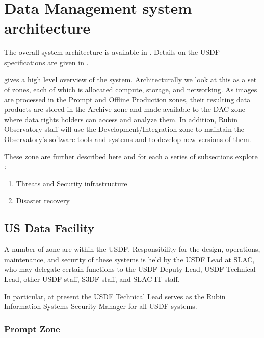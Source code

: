 

\section{Data Management system architecture} \label{sec:dparc}
The overall system architecture is available in .
Details on the \gls{USDF} specifications are given in .

 gives a high level overview of the system. Architecturally we look
at this as a set of zones, each of which is allocated compute, storage, and networking.
As images are processed in the Prompt and Offline Production zones, their resulting data products are stored in the \gls{Archive} zone and made available to the \gls{DAC} zone where data rights holders can access and analyze them.
In addition, Rubin Observatory staff will use the Development/Integration zone to maintain the Observatory's \gls{software} tools and systems and to develop new versions of them.

These zone are further described here and for each a series of subsections explore :


\begin{enumerate}
\item Threats and Security infrastructure
\item Disaster recovery
\end{enumerate}

\subsection{US Data Facility}\label{sec:usdf}

A number of zone are within the \gls{USDF}.
Responsibility for the design, operations, maintenance, and security of these systems is held by the \gls{USDF} Lead at SLAC, who may delegate certain functions to the \gls{USDF} Deputy Lead, \gls{USDF} Technical Lead, other \gls{USDF} staff, S3DF staff, and SLAC IT staff.

In particular, at present the USDF Technical Lead serves as the Rubin Information Systems Security Manager for all USDF systems.

\subsubsection{Prompt Zone} \label{sec:promptenc}

